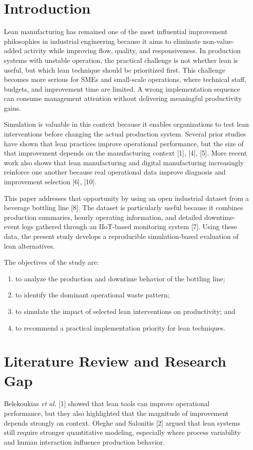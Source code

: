 \documentclass[12pt,a4paper]{article}
\begin{document}
\section{Introduction}
Lean manufacturing has remained one of the most influential improvement philosophies in industrial engineering because it aims to eliminate non-value-added activity while improving flow, quality, and responsiveness. In production systems with unstable operation, the practical challenge is not whether lean is useful, but which lean technique should be prioritized first. This challenge becomes more serious for SMEs and small-scale operations, where technical staff, budgets, and improvement time are limited. A wrong implementation sequence can consume management attention without delivering meaningful productivity gains.

Simulation is valuable in this context because it enables organizations to test lean interventions before changing the actual production system. Several prior studies have shown that lean practices improve operational performance, but the size of that improvement depends on the manufacturing context [1], [4], [5]. More recent work also shows that lean manufacturing and digital manufacturing increasingly reinforce one another because real operational data improve diagnosis and improvement selection [6], [10].

This paper addresses that opportunity by using an open industrial dataset from a beverage bottling line [8]. The dataset is particularly useful because it combines production summaries, hourly operating information, and detailed downtime-event logs gathered through an IIoT-based monitoring system [7]. Using these data, the present study develops a reproducible simulation-based evaluation of lean alternatives.

The objectives of the study are:
\begin{enumerate}
    \item to analyze the production and downtime behavior of the bottling line;
    \item to identify the dominant operational waste pattern;
    \item to simulate the impact of selected lean interventions on productivity; and
    \item to recommend a practical implementation priority for lean techniques.
\end{enumerate}

\section{Literature Review and Research Gap}
Belekoukias \emph{et al.} [1] showed that lean tools can improve operational performance, but they also highlighted that the magnitude of improvement depends strongly on context. Oleghe and Salonitis [2] argued that lean systems still require stronger quantitative modeling, especially where process variability and human interaction influence production behavior.
\end{document}
